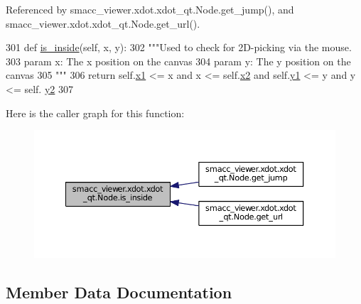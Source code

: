 Referenced by smacc\+\_\+viewer.\+xdot.\+xdot\+\_\+qt.\+Node.\+get\+\_\+jump(), and smacc\+\_\+viewer.\+xdot.\+xdot\+\_\+qt.\+Node.\+get\+\_\+url().


\begin{DoxyCode}
301     \textcolor{keyword}{def }\hyperlink{classsmacc__viewer_1_1xdot_1_1xdot__qt_1_1Node_a02f21863c16541b673dc4d8ebeafbf00}{is\_inside}(self, x, y):
302         \textcolor{stringliteral}{"""Used to check for 2D-picking via the mouse.}
303 \textcolor{stringliteral}{        param x: The x position on the canvas}
304 \textcolor{stringliteral}{        param y: The y position on the canvas}
305 \textcolor{stringliteral}{        """}
306         \textcolor{keywordflow}{return} self.\hyperlink{classsmacc__viewer_1_1xdot_1_1xdot__qt_1_1Node_ae31872230f5ef222322a4cc04e7d5df8}{x1} <= x \textcolor{keywordflow}{and} x <= self.\hyperlink{classsmacc__viewer_1_1xdot_1_1xdot__qt_1_1Node_a6db9655a45494d9daff50dfedb593db3}{x2} \textcolor{keywordflow}{and} self.\hyperlink{classsmacc__viewer_1_1xdot_1_1xdot__qt_1_1Node_aaef3e410d013f329d8b7a6528ae77156}{y1} <= y \textcolor{keywordflow}{and} y <= self.
      \hyperlink{classsmacc__viewer_1_1xdot_1_1xdot__qt_1_1Node_ab028844a0751b9ea11e89cc25f6b54cd}{y2}
307 
\end{DoxyCode}


Here is the caller graph for this function\+:
\nopagebreak
\begin{figure}[H]
\begin{center}
\leavevmode
\includegraphics[width=350pt]{classsmacc__viewer_1_1xdot_1_1xdot__qt_1_1Node_a02f21863c16541b673dc4d8ebeafbf00_icgraph}
\end{center}
\end{figure}




\subsection{Member Data Documentation}
